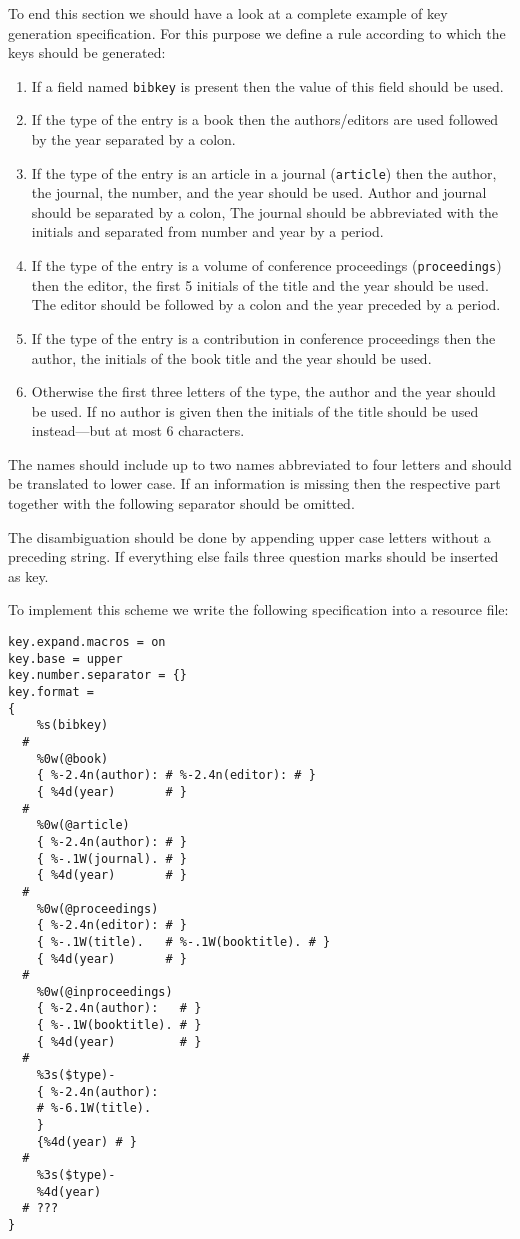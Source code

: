 \documentclass[11pt,a4paper]{scrbook}
\begin{document}
To end this section we should have a look at a complete example of key
generation specification. For this purpose we define a rule according to which
the keys should be generated:
\begin{enumerate}
\item If a field named \texttt{bibkey} is present then the value of this field
  should be used.
\item If the type of the entry is a book then the authors/editors are used
  followed by the year separated by a colon.
\item If the type of the entry is an article in a journal (\texttt{article}) then
  the author, the journal, the number, and the year should be used. Author and
  journal should be separated by a colon, The journal should be abbreviated
  with the initials and separated from number and year by a period.
\item If the type of the entry is a volume of conference proceedings
  (\texttt{proceedings}) then the editor, the first 5 initials of the title
  and the year should be used. The editor should be followed by a colon and
  the year preceded by a period.
\item If the type of the entry is a contribution in conference proceedings
  then the author, the initials of the book title and the year should be used.
\item Otherwise the first three letters of the type, the author and the
  year should be used. If no author is given then the initials of the
  title should be used instead---but at most 6 characters.
\end{enumerate}
The names should include up to two names abbreviated to four letters and
should be translated to lower case. If an information is missing then the
respective part together with the following separator should be omitted.

The disambiguation should be done by appending upper case letters without a
preceding string. If everything else fails three question marks should be
inserted as key.

To implement this scheme we write the following specification into a resource
file:
\begin{lstlisting}[language=BibTool]
key.expand.macros = on
key.base = upper
key.number.separator = {}
key.format =
{
    %s(bibkey)
  #
    %0w(@book)
    { %-2.4n(author): # %-2.4n(editor): # }
    { %4d(year)       # }
  #
    %0w(@article)
    { %-2.4n(author): # }
    { %-.1W(journal). # }
    { %4d(year)       # }
  #
    %0w(@proceedings)
    { %-2.4n(editor): # }
    { %-.1W(title).   # %-.1W(booktitle). # }
    { %4d(year)       # }
  #
    %0w(@inproceedings)
    { %-2.4n(author):   # }
    { %-.1W(booktitle). # }
    { %4d(year)         # }
  #
    %3s($type)-
    { %-2.4n(author):
    # %-6.1W(title).
    }
    {%4d(year) # }
  #
    %3s($type)-
    %4d(year)
  # ???
}
\end{lstlisting}
  
\end{document}
